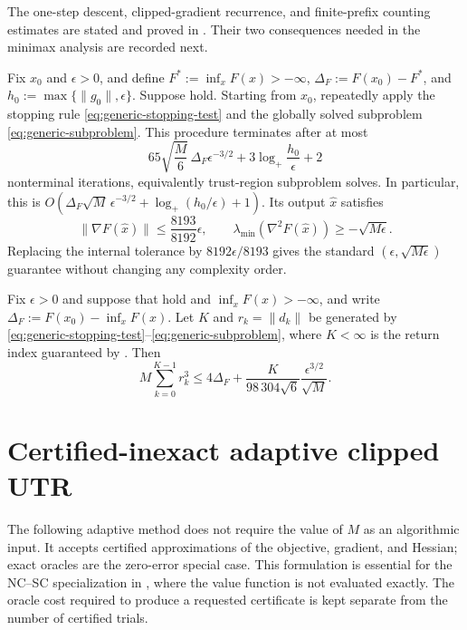 \documentclass{article}
\begin{document}
The one-step descent, clipped-gradient recurrence, and finite-prefix
counting estimates are stated and proved in
.  Their two consequences needed in the
minimax analysis are recorded next.

\begin{theorem}
\label{thm:generic-complexity}
Fix $x_0$ and $\epsilon>0$, and define
$F^*:=\inf_xF(x)>-\infty$,
$\Delta_F:=F(x_0)-F^*$, and
$h_0:=\max\{\|g_0\|,\epsilon\}$.  Suppose
 hold.  Starting from $x_0$,
repeatedly apply the stopping rule
\eqref{eq:generic-stopping-test} and the globally solved subproblem
\eqref{eq:generic-subproblem}.  This procedure terminates after at most
\begin{equation}\label{eq:generic-complexity}
  65\sqrt{\frac M6}\,\Delta_F\epsilon^{-3/2}
  +3\log_+\!\frac{h_0}{\epsilon}+2
\end{equation}
nonterminal iterations, equivalently trust-region subproblem solves.
In particular, this is
$O(\Delta_F\sqrt M\,\epsilon^{-3/2}
+\log_+(h_0/\epsilon)+1)$.  Its output $\widehat x$
satisfies
\begin{equation}\label{eq:generic-return}
  \|\nabla F(\widehat x)\|\le\frac{8193}{8192}\epsilon,
  \qquad
  \lambda_{\min}(\nabla^2F(\widehat x))
  \ge-\sqrt{M\epsilon}.
\end{equation}
Replacing the internal tolerance by $8192\epsilon/8193$ gives the
standard $(\epsilon,\sqrt{M\epsilon})$ guarantee without changing any
complexity order.
\end{theorem}




\begin{lemma}\label{lem:cubic-path}
Fix $\epsilon>0$ and suppose that 
hold and $\inf_xF(x)>-\infty$, and write
$\Delta_F:=F(x_0)-\inf_xF(x)$.  Let $K$ and
$r_k=\|d_k\|$ be generated by
\eqref{eq:generic-stopping-test}--\eqref{eq:generic-subproblem}, where
$K<\infty$ is the return index guaranteed by
.  Then
\begin{equation}\label{eq:cubic-path}
  M\sum_{k=0}^{K-1}r_k^3
  \le4\Delta_F
    +\frac{K}{98\,304\sqrt6}\frac{\epsilon^{3/2}}{\sqrt M}.
\end{equation}
\end{lemma}




\section{Certified-inexact adaptive clipped UTR}
\label{sec:adaptive-utr}
The following adaptive method does not require the value of $M$ as an
algorithmic input.  It accepts certified approximations of the
objective, gradient, and Hessian; exact oracles are the zero-error
special case.  This formulation is essential for the NC--SC
specialization in , where the value function is not
evaluated exactly.  The oracle cost required to produce a requested
certificate is kept separate from the number of certified trials.
\end{document}
